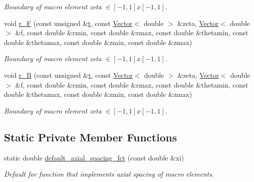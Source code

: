 \begin{DoxyCompactItemize}
\begin{DoxyCompactList}\small\item\em Boundary of macro element zeta $ \in [-1,1]x[-1,1] $. \end{DoxyCompactList}\item 
void \hyperlink{classoomph_1_1QuarterPipeDomain_a85aaa5d1217c49e2144bbfd37dbad0fd}{r\+\_\+F} (const unsigned \&\hyperlink{cfortran_8h_af6f0bd3dc13317f895c91323c25c2b8f}{t}, const \hyperlink{classoomph_1_1Vector}{Vector}$<$ double $>$ \&zeta, \hyperlink{classoomph_1_1Vector}{Vector}$<$ double $>$ \&f, const double \&rmin, const double \&rmax, const double \&thetamin, const double \&thetamax, const double \&zmin, const double \&zmax)
\begin{DoxyCompactList}\small\item\em Boundary of macro element zeta $ \in [-1,1]x[-1,1] $. \end{DoxyCompactList}\item 
void \hyperlink{classoomph_1_1QuarterPipeDomain_aba1af5e7f1bc6e88ff8e9ee59e965630}{r\+\_\+B} (const unsigned \&\hyperlink{cfortran_8h_af6f0bd3dc13317f895c91323c25c2b8f}{t}, const \hyperlink{classoomph_1_1Vector}{Vector}$<$ double $>$ \&zeta, \hyperlink{classoomph_1_1Vector}{Vector}$<$ double $>$ \&f, const double \&rmin, const double \&rmax, const double \&thetamin, const double \&thetamax, const double \&zmin, const double \&zmax)
\begin{DoxyCompactList}\small\item\em Boundary of macro element zeta $ \in [-1,1]x[-1,1] $. \end{DoxyCompactList}\end{DoxyCompactItemize}
\subsection*{Static Private Member Functions}
\begin{DoxyCompactItemize}
\item 
static double \hyperlink{classoomph_1_1QuarterPipeDomain_a3b79d0bf40336f7961a8b2bb58080dba}{default\+\_\+axial\+\_\+spacing\+\_\+fct} (const double \&xi)
\begin{DoxyCompactList}\small\item\em Default for function that implements axial spacing of macro elements. \end{DoxyCompactList}\end{DoxyCompactItemize}
